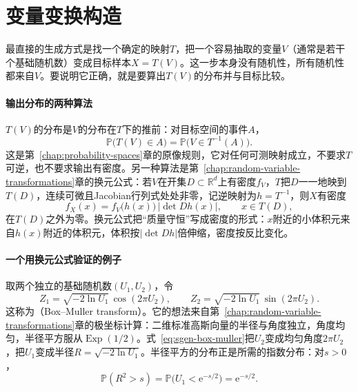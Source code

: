 \section{变量变换构造}
\label{sec:sgen-transform}

最直接的生成方式是找一个确定的映射$T$，把一个容易抽取的变量$V$（通常是若干个基础随机数）变成目标样本$X=T(V)$。这一步本身没有随机性，所有随机性都来自$V$。要说明它正确，就是要算出$T(V)$的分布并与目标比较。

\paragraph{输出分布的两种算法}
$T(V)$的分布是$V$的分布在$T$下的推前：对目标空间的事件$A$，
\[
  \mathbb{P}\bigl(T(V)\in A\bigr)=\mathbb{P}\bigl(V\in T^{-1}(A)\bigr).
\]
这是第~\ref{chap:probability-spaces}章的原像规则，它对任何可测映射成立，不要求$T$可逆，也不要求输出有密度。另一种算法是第~\ref{chap:random-variable-transformations}章的换元公式：若$V$在开集$D\subset\mathbb{R}^{d}$上有密度$f_V$，$T$把$D$一一地映到$T(D)$，连续可微且Jacobian行列式处处非零，记逆映射为$h=T^{-1}$，则$X$有密度
\begin{equation}
  f_X(x)=f_V\bigl(h(x)\bigr)\,\bigl\lvert\det Dh(x)\bigr\rvert,\qquad x\in T(D),
  \label{eq:sgen-change-of-variables}
\end{equation}
在$T(D)$之外为零。换元公式把“质量守恒”写成密度的形式：$x$附近的小体积元来自$h(x)$附近的体积元，体积按$\lvert\det Dh\rvert$倍伸缩，密度按反比变化。

\paragraph{一个用换元公式验证的例子}
取两个独立的基础随机数$(U_1,U_2)$，令
\begin{equation}
  Z_1=\sqrt{-2\ln U_1}\,\cos(2\pi U_2),\qquad Z_2=\sqrt{-2\ln U_1}\,\sin(2\pi U_2).
  \label{eq:sgen-box-muller}
\end{equation}
这称为（Box--Muller transform）。它的想法来自第~\ref{chap:random-variable-transformations}章的极坐标计算：二维标准高斯向量的半径与角度独立，角度均匀，半径平方服从$\operatorname{Exp}(1/2)$。式~\eqref{eq:sgen-box-muller}把$U_2$变成均匀角度$2\pi U_2$，把$U_1$变成半径$R=\sqrt{-2\ln U_1}$。半径平方的分布正是所需的指数分布：对$s>0$，
\[
  \mathbb{P}(R^{2}>s)=\mathbb{P}\bigl(U_1<\mathrm{e}^{-s/2}\bigr)=\mathrm{e}^{-s/2}.
\]

